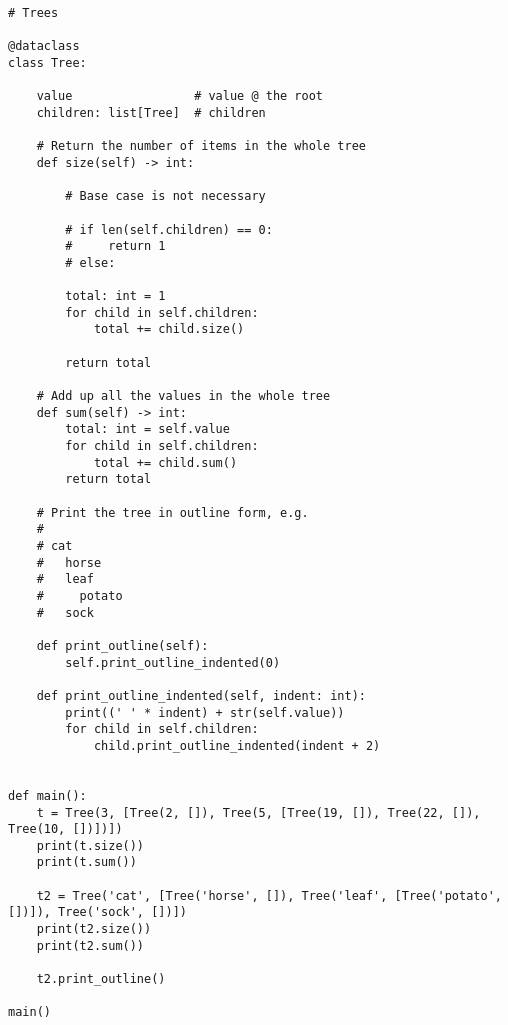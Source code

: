 \documentclass{article}
\newenvironment{reflect}[1]
{
  \noindent
  \begin{lrbox}{\reflectbox}
    \begin{minipage}[t]{\textwidth}
      \textbf{#1}:
}{
    \end{minipage}
  \end{lrbox}
  \fbox{\usebox{\reflectbox}}
}
\newcommand{\notready}{\textcolor{red}{\XSolidBold}\xspace}
\begin{document}
\begin{verbatim}
# Trees

@dataclass
class Tree:

    value                 # value @ the root
    children: list[Tree]  # children

    # Return the number of items in the whole tree
    def size(self) -> int:

        # Base case is not necessary

        # if len(self.children) == 0:
        #     return 1
        # else:

        total: int = 1
        for child in self.children:
            total += child.size()

        return total

    # Add up all the values in the whole tree
    def sum(self) -> int:
        total: int = self.value
        for child in self.children:
            total += child.sum()
        return total

    # Print the tree in outline form, e.g.
    #
    # cat
    #   horse
    #   leaf
    #     potato
    #   sock

    def print_outline(self):
        self.print_outline_indented(0)

    def print_outline_indented(self, indent: int):
        print((' ' * indent) + str(self.value))
        for child in self.children:
            child.print_outline_indented(indent + 2)


def main():
    t = Tree(3, [Tree(2, []), Tree(5, [Tree(19, []), Tree(22, []), Tree(10, [])])])
    print(t.size())
    print(t.sum())

    t2 = Tree('cat', [Tree('horse', []), Tree('leaf', [Tree('potato', [])]), Tree('sock', [])])
    print(t2.size())
    print(t2.sum())

    t2.print_outline()

main()
\end{verbatim}


\end{document}
